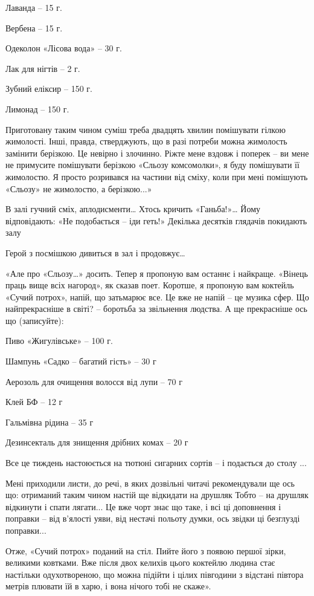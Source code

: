 Лаванда – 15 г.

Вербена – 15 г.

Одеколон «Лісова вода» – 30 г.

Лак для нігтів – 2 г.

Зубний еліксир – 150 г.

Лимонад – 150 г.

Приготовану таким чином суміш треба двадцять хвилин помішувати гілкою
жимолості. Інші, правда, стверджують, що в разі потреби можна жимолость
замінити берізкою. Це невірно і злочинно. Ріжте мене вздовж і поперек – ви мене
не примусите помішувати берізкою «Сльозу комсомолки», я буду помішувати її
жимолостю. Я просто розривався на частини від сміху, коли при мені помішують
«Сльозу» не жимолостю, а берізкою...»

В залі гучний сміх, аплодисменти… Хтось кричить «Ганьба!»… Йому відповідають:
«Не подобається – іди геть!» Декілька десятків глядачів покидають залу 

Герой з посмішкою дивиться в зал і продовжує…

«Але про «Сльозу…» досить. Тепер я пропоную вам останнє і найкраще. «Вінець
праць вище всіх нагород», як сказав поет. Коротше, я пропоную вам коктейль
«Сучий потрох», напій, що затьмарює все. Це вже не напій – це музика сфер. Що
найпрекрасніше в світі? –  боротьба за звільнення людства. А ще прекрасніше ось
що (записуйте):

Пиво «Жигулівське» – 100 г.

Шампунь «Садко – багатий гість» – 30 г

Аерозоль для очищення волосся від лупи – 70 г

Клей БФ – 12 г

Гальмівна рідина – 35 г

Дезинсекталь для знищення дрібних комах – 20 г

Все це тиждень настоюється на тютюні сигарних сортів – і подається до столу ...

Мені приходили листи, до речі, в яких дозвільні читачі рекомендували ще ось що:
отриманий таким чином настій ще відкидати на друшляк Тобто – на друшляк
відкинути і спати лягати... Це вже чорт знає що таке, і всі ці доповнення і
поправки – від в'ялості уяви, від нестачі польоту думки, ось звідки ці
безглузді поправки...

Отже, «Сучий потрох» поданий на стіл. Пийте його з появою першої зірки,
великими ковтками. Вже після двох келихів цього коктейлю людина стає настільки
одухотвореною, що можна підійти і цілих півгодини з відстані півтора метрів
плювати їй в харю, і вона нічого тобі не скаже».

